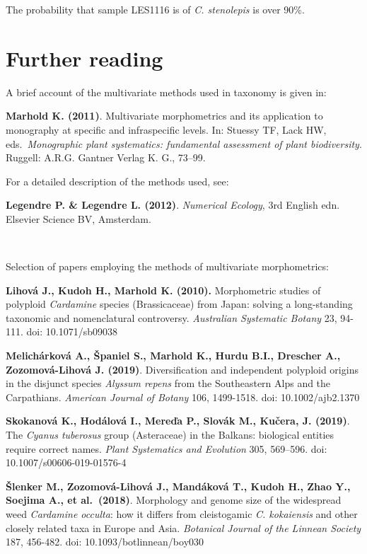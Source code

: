 \documentclass[
]{article}
\begin{document}
The probability that sample LES1116 is of \emph{C. stenolepis} is over
90\%.

\newpage

\hypertarget{further-reading}{%
\section{Further reading}\label{further-reading}}

A brief account of the multivariate methods used in taxonomy is given
in:

\textbf{Marhold K. (2011)}. Multivariate morphometrics and its
application to monography at specific and infraspecific levels. In:
Stuessy TF, Lack HW, eds.~\emph{Monographic plant systematics:
fundamental assessment of plant biodiversity}. Ruggell: A.R.G. Gantner
Verlag K. G., 73--99.

For a detailed description of the methods used, see:

\textbf{Legendre P. \& Legendre L. (2012)}. \emph{Numerical Ecology},
3rd English edn. Elsevier Science BV, Amsterdam.

~

Selection of papers employing the methods of multivariate morphometrics:

\textbf{Lihová J., Kudoh H., Marhold K. (2010).} Morphometric studies of
polyploid \emph{Cardamine} species (Brassicaceae) from Japan: solving a
long-standing taxonomic and nomenclatural controversy. \emph{Australian
Systematic Botany} 23, 94-111. doi: 10.1071/sb09038

\textbf{Melichárková A., Španiel S., Marhold K., Hurdu B.I., Drescher
A., Zozomová-Lihová J. (2019)}. Diversification and independent
polyploid origins in the disjunct species \emph{Alyssum repens} from the
Southeastern Alps and the Carpathians. \emph{American Journal of Botany}
106, 1499-1518. doi: 10.1002/ajb2.1370

\textbf{Skokanová K., Hodálová I., Mereďa P., Slovák M., Kučera, J.
(2019)}. The \emph{Cyanus tuberosus} group (Asteraceae) in the Balkans:
biological entities require correct names. \emph{Plant Systematics and
Evolution} 305, 569--596. doi: 10.1007/s00606-019-01576-4

\textbf{Šlenker M., Zozomová-Lihová J., Mandáková T., Kudoh H., Zhao Y.,
Soejima A., et al.~(2018)}. Morphology and genome size of the widespread
weed \emph{Cardamine occulta}: how it differs from cleistogamic \emph{C.
kokaiensis} and other closely related taxa in Europe and Asia.
\emph{Botanical Journal of the Linnean Society} 187, 456-482. doi:
10.1093/botlinnean/boy030
\end{document}
